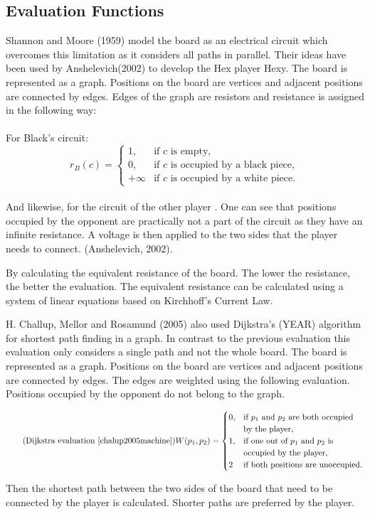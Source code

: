 \documentclass{ba-kecs}
\begin{document}
\subsection{Evaluation Functions}
Shannon and Moore (1959) model the board as an electrical circuit which overcomes this limitation as it considers all paths in parallel. Their ideas have been used by Anshelevich(2002)\cite{anshelevich2002hierarchical} to develop the Hex player Hexy. The board is represented as a graph. Positions on the board are vertices and adjacent positions are connected by edges. Edges of the graph are resistors and resistance is assigned in the following way: 
\\
\\
For Black's circuit:  \\
\begin{equation*}
r_B(c)=\begin{cases}
1, & \text{if $c$ is empty},\\
0, & \text{if $c$ is occupied by a black piece},\\
+\infty & \text{if $c$ is occupied by a white piece}.
\end{cases}
\end{equation*}
\\
And likewise, for the circuit of the other player . 
One can see that positions occupied by the opponent are practically not a part of the circuit as they have an infinite resistance. A voltage is then applied to the two sides that the player needs to connect. (Anshelevich, 2002)\cite{anshelevich2002hierarchical}.

By calculating the equivalent resistance of the board. The lower the resistance, the better the evaluation. The equivalent resistance can be calculated using a system of linear equations based on Kirchhoff’s Current Law.

H. Challup, Mellor and Rosamund (2005)\cite{chalup2005machine} also used Dijkstra’s (YEAR) algorithm for shortest path finding in a graph. In contrast to the previous evaluation this evaluation only considers a single path and not the whole board.  The board is represented as a graph. Positions on the board are vertices and adjacent positions are connected by edges. The edges are weighted using the following evaluation. Positions occupied by the opponent do not belong to the graph.
\begin{center}
\begin{equation*}
\tag{Dijkstra evaluation \cite{chalup2005machine}}
W(p_1,p_2)=\begin{cases}
0, & \text{if $p_1$  and $p_2$ are both occupied}\\
   & \text{by the player},\\
1, & \text{if one out of $p_1$ and $p_2$ is}\\
   & \text{occupied by the player},\\
2 & \text{if both positions are unoccupied}.
\end{cases}
\end{equation*}
\end{center}
Then the shortest path between the two sides of the board that need to be connected by the player is calculated. Shorter paths are preferred by the player. 
\end{document}
